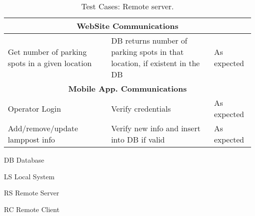 \begin{table}[H]
\begin{threeparttable}
{\begin{tabular}{|m{4cm}|m{5cm}||m{5cm}|}
			\multicolumn{3}{c}{\textbf{WebSite Communications}}\\\hline
			Get number of parking spots in a given location & DB returns number of parking spots in that location, if existent in the DB & As expected
			\\\hline
			
			\multicolumn{3}{c}{\textbf{Mobile App. Communications}}\\\hline
			Operator Login & Verify credentials & As expected
			\\\hline
			Add/remove/update lamppost info & Verify new info and insert into DB if valid & As expected
			\\\hline
		\end{tabular}
	}
	
		\begin{tablenotes}
			\small
			\item[DB]Database
			\item[LS]Local System
			\item[RS]Remote Server
			\item[RC]Remote Client
		\end{tablenotes}
	\end{threeparttable}

	\caption{Test Cases: Remote server.}
	\label{table:test_rs}
\end{table}
